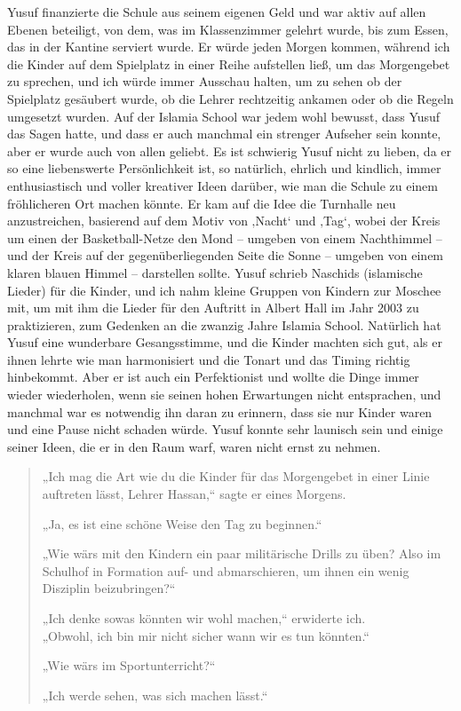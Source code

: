 \documentclass[12pt]{memoir}
\def\–{\hskip0pt-\hskip0pt}
\begin{document}
Yusuf finanzierte die Schule aus seinem eigenen Geld
und war aktiv auf allen Ebenen beteiligt,
von dem, was im Klassenzimmer gelehrt wurde, bis zum Essen,
das in der Kantine serviert wurde.
Er würde jeden Morgen kommen, während ich die Kinder
auf dem Spielplatz in einer Reihe aufstellen ließ,
um das Morgengebet zu sprechen,
und ich würde immer Ausschau halten,
um zu sehen ob der Spielplatz gesäubert wurde,
ob die Lehrer rechtzeitig ankamen oder ob die Regeln umgesetzt wurden.
Auf der Islamia School war jedem wohl bewusst, dass Yusuf das Sagen hatte,
und dass er auch manchmal ein strenger Aufseher sein konnte,
aber er wurde auch von allen geliebt.
Es ist schwierig Yusuf nicht zu lieben,
da er so eine liebenswerte Persönlichkeit ist,
so natürlich, ehrlich und kindlich,
immer enthusiastisch und voller kreativer Ideen darüber,
wie man die Schule zu einem fröhlicheren Ort machen könnte.
Er kam auf die Idee die Turnhalle neu anzustreichen,
basierend auf dem Motiv von ‚Nacht‘ und ‚Tag‘,
wobei der Kreis um einen der Basketball\–Netze
den Mond – umgeben von einem Nachthimmel –
und der Kreis auf der gegenüberliegenden Seite
die Sonne – umgeben von einem klaren blauen Himmel – darstellen sollte.
Yusuf schrieb Naschids (islamische Lieder) für die Kinder,
und ich nahm kleine Gruppen von Kindern zur Moschee mit,
um mit ihm die Lieder für den Auftritt
in Albert Hall im Jahr 2003 zu praktizieren,
zum Gedenken an die zwanzig Jahre Islamia School.
Natürlich hat Yusuf eine wunderbare Gesangsstimme,
und die Kinder machten sich gut,
als er ihnen lehrte wie man harmonisiert und
die Tonart und das Timing richtig hinbekommt.
Aber er ist auch ein Perfektionist und wollte
die Dinge immer wieder wiederholen,
wenn sie seinen hohen Erwartungen nicht entsprachen,
und manchmal war es notwendig ihn daran zu erinnern,
dass sie nur Kinder waren und eine Pause nicht schaden würde.
Yusuf konnte sehr launisch sein und einige seiner Ideen,
die er in den Raum warf, waren nicht ernst zu nehmen.

\begin{quote}
„Ich mag die Art wie du die Kinder für das Morgengebet
in einer Linie auftreten lässt, Lehrer Hassan,“ sagte er eines Morgens.

„Ja, es ist eine schöne Weise den Tag zu beginnen.“

„Wie wärs mit den Kindern ein paar militärische Drills zu üben?
Also im Schulhof in Formation  auf- und abmarschieren,
um ihnen ein wenig Disziplin beizubringen?“

„Ich denke sowas könnten wir wohl machen,“ erwiderte ich.\\
„Obwohl, ich bin mir nicht sicher wann wir es tun könnten.“

„Wie wärs im Sportunterricht?“

„Ich werde sehen, was sich machen lässt.“
\end{quote}
\end{document}
